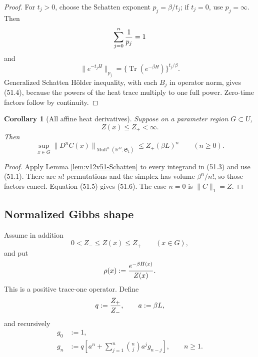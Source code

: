 \documentclass[11pt]{article}
\newtheorem{corollary}[theorem]{Corollary}
\theoremstyle{remark}
\begin{document}
\begin{proof}
For \(t_j>0\), choose the Schatten exponent
\(p_j=\beta/t_j\); if \(t_j=0\), use \(p_j=\infty\).
Then
\[
 \sum_{j=0}^n{1\over p_j}=1
\]
and
\[
 \|e^{-t_jH}\|_{p_j}
 =
 \{\operatorname{Tr}(e^{-\beta H})\}^{t_j/\beta}.
\]
Generalized Schatten H\"older inequality, with each \(B_j\) in
operator norm, gives (51.4), because the powers of the heat trace
multiply to one full power.  Zero-time factors follow by continuity.
\end{proof}

\begin{corollary}[All affine heat derivatives]
\label{cor:v12v51-heat-derivatives}
Suppose on a parameter region \(G\subset U\),
\begin{equation}
                         Z(x)\leq Z_+<\infty.      \tag{51.5}
\end{equation}
Then
\begin{equation}
 \sup_{x\in G}
 \|D^nC(x)\|_{\operatorname{Mult}^n
  (\mathbb R^D;{\mathfrak S}_1)}
 \leq
 Z_+(\beta L)^n
 \qquad(n\geq0).                                 \tag{51.6}
\end{equation}
\end{corollary}

\begin{proof}
Apply Lemma \ref{lem:v12v51-Schatten} to every integrand in (51.3)
and use (51.1).  There are \(n!\) permutations and the simplex has
volume \(\beta^n/n!\), so those factors cancel.  Equation (51.5)
gives (51.6).  The case \(n=0\) is \(\|C\|_1=Z\).
\end{proof}

\subsection{Normalized Gibbs shape}

Assume in addition
\begin{equation}
                         0<Z_-\leq Z(x)\leq Z_+
 \qquad(x\in G),                                  \tag{51.7}
\end{equation}
and put
\[
 \rho(x):={e^{-\beta H(x)}\over Z(x)}.
\]
This is a positive trace-one operator.  Define
\[
 q:={Z_+\over Z_-},\qquad a:=\beta L,
\]
and recursively
\begin{align}
 g_0&:=1,                                         \tag{51.8}\\
 g_n&:=
 q\left[
 a^n+\sum_{j=1}^n\binom nj a^jg_{n-j}
 \right],
 \qquad n\geq1.                                   \tag{51.9}
\end{align}
\end{document}
